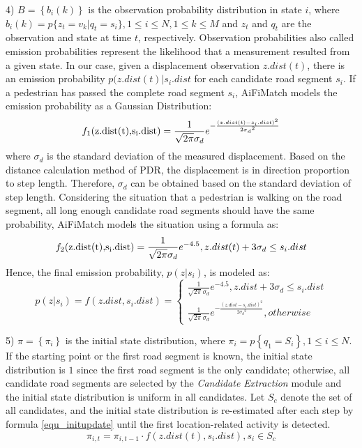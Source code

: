 \documentclass{llncs}
\begin{document}
4) $B = \left\{ {{b_i}(k)} \right\}$ is the observation probability distribution in state $i$, where ${b_i}(k) = p\{ {z_t} = {v_k}|{q_t} = {s_i}\},1 \le i \le N,1 \le k \le M$ and $z_t$ and $q_t$ are the observation and state at time $t$, respectively. Observation probabilities also called emission probabilities represent the likelihood that a measurement resulted from a given state. In our case, given a displacement observation $z.dist(t)$, there is an emission probability $p(z.dist(t)|{s_i}.dist$ for each candidate road segment $s_i$. If a pedestrian has passed the complete road segment $s_i$, AiFiMatch models the emission probability as a Gaussian Distribution:
\begin{equation}
\label{equ_emission1}
{f_1}({\rm{z}}{\rm{.dist(t),}}{{\rm{s}}_{\rm{i}}}{\rm{.dist}}) = \frac{1}{{\sqrt {2\pi } {\sigma _d}}}{e^{ - \frac{{{{(z.dist(t) - {s_i}.dist)}^2}}}{{2{\sigma _d}^2}}}}
\end{equation}
where $\sigma _d$ is the standard deviation of the measured displacement. Based on the distance calculation method of PDR, the displacement is in direction proportion to step length. Therefore, $\sigma _d$ can be obtained based on the standard deviation of step length. Considering the situation that a pedestrian is walking on the road segment, all long enough candidate road segments should have the same probability, AiFiMatch models the situation using a formula as:
\begin{equation}
{f_2}({\rm{z}}{\rm{.dist(t),}}{{\rm{s}}_{\rm{i}}}{\rm{.dist}}) = \frac{1}{{\sqrt {2\pi } {\sigma _d}}}{e^{-4.5}},z.dist(t) + 3{\sigma _d} \le {s_i}.dist
\end{equation}
Hence, the final emission probability, $p(z|s_i)$, is modeled as:
\begin{equation}
p(z|s_i)=f(z.dist,{s_i}.dist) = \left\{ {\begin{array}{*{20}{l}}
	{\frac{1}{{\sqrt {2\pi } {\sigma _d}}}{e^{-4.5}},z.dist + 3{\sigma _d} \le {s_i}.dist}\\
	{\frac{1}{{\sqrt {2\pi } {\sigma _d}}}{e^{ - \frac{{{{(z.dist - {s_i}.dist)}^2}}}{{2{\sigma _d}^2}}}},otherwise}
	\end{array}} \right.
\end{equation}

5) $\pi  = \left\{ {{\pi _i}} \right\}$ is the initial state distribution, where ${\pi _i} = p\left\{ {{q_1} = {S_i}} \right\},1 \le i \le N$. If the starting point or the first road segment is known, the initial state distribution is $1$ since the first road segment is the only candidate; otherwise, all candidate road segments are selected by the \emph{Candidate Extraction} module and the initial state distribution is uniform in all candidates. Let $S_c$ denote the set of all candidates, and the initial state distribution is re-estimated after each step by formula \ref{equ_initupdate} until the first location-related activity is detected.
\begin{equation}
\label{equ_initupdate}
{\pi _{i,t}} = {\pi _{i,t - 1}} \cdot f(z.dist(t),{s_i}.dist),{s_i} \in {S_c}
\end{equation}
\end{document}
